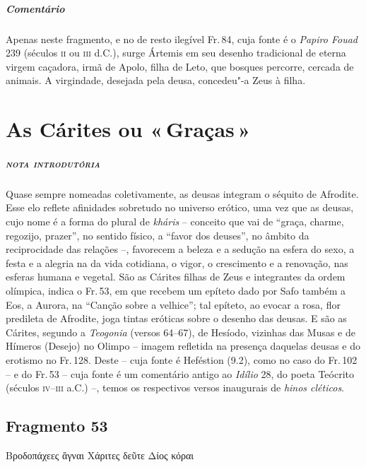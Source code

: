 {\paragraph{Comentário} Apenas neste fragmento, e no de resto ilegível Fr.\,84, cuja fonte é o \textit{Papiro Fouad }239 (séculos \textsc{ii} ou
\textsc{iii} d.C.), surge Ártemis em seu desenho tradicional de eterna virgem caçadora,
irmã de Apolo, filha de Leto, que bosques percorre, cercada de animais. A
virgindade, desejada pela deusa, concedeu"-a Zeus à filha.}




\chapter{As Cárites ou «\,Graças\,»}

\paragraph{\textsc{nota introdutória}}
Quase sempre nomeadas coletivamente, as deusas integram o séquito de Afrodite.
Esse elo reflete afinidades sobretudo no universo erótico, uma vez que as
deusas, cujo nome é a forma do plural de \textit{kháris }-- conceito que vai de
“graça, charme, regozijo, prazer”, no sentido físico, a “favor dos deuses”, no
âmbito da reciprocidade das relações --, favorecem a beleza e a sedução na
esfera do sexo, a festa e a alegria na da vida cotidiana, o vigor, o
crescimento e a renovação, nas esferas humana e vegetal. São as Cárites
filhas de Zeus e integrantes da ordem olímpica, indica o Fr.\,53, em que
recebem um epíteto dado por Safo também a Eos, a Aurora, na ``Canção sobre a velhice'';
tal epíteto, ao evocar a rosa, flor predileta de Afrodite, joga tintas eróticas
sobre o desenho das deusas. E são as Cárites, segundo a \textit{Teogonia}
(versos 64--67), de Hesíodo, vizinhas das Musas e de Hímeros (Desejo) no Olimpo -- imagem refletida na presença daquelas deusas e do erotismo no Fr.\,128. Deste -- cuja fonte é Heféstion (9.2), como no caso do Fr.\,102 -- e do
Fr.\,53 -- cuja fonte é um comentário antigo ao \textit{Idílio }28, do poeta
Teócrito (séculos \textsc{iv}--\textsc{iii} a.C.) --, temos os respectivos versos inaugurais de
\textit{hinos cléticos}.

\pagebreak
\section{Fragmento 53} 

\begin{gkverse}
Βροδοπάχεες ἄγναι Χάριτες δεῦτε Δίος κόραι
\end{gkverse}

